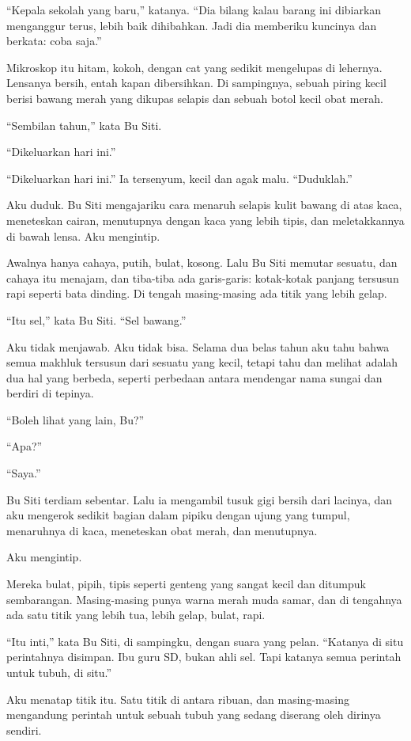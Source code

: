 \documentclass[11pt,twoside,openany]{book}
\begin{document}
``Kepala sekolah yang baru,'' katanya. ``Dia bilang kalau barang ini dibiarkan menganggur terus, lebih baik dihibahkan. Jadi dia memberiku kuncinya dan berkata: coba saja.''

Mikroskop itu hitam, kokoh, dengan cat yang sedikit mengelupas di lehernya. Lensanya bersih, entah kapan dibersihkan. Di sampingnya, sebuah piring kecil berisi bawang merah yang dikupas selapis dan sebuah botol kecil obat merah.

``Sembilan tahun,'' kata Bu Siti.

``Dikeluarkan hari ini.''

``Dikeluarkan hari ini.'' Ia tersenyum, kecil dan agak malu. ``Duduklah.''

Aku duduk. Bu Siti mengajariku cara menaruh selapis kulit bawang di atas kaca, meneteskan cairan, menutupnya dengan kaca yang lebih tipis, dan meletakkannya di bawah lensa. Aku mengintip.

Awalnya hanya cahaya, putih, bulat, kosong. Lalu Bu Siti memutar sesuatu, dan cahaya itu menajam, dan tiba-tiba ada garis-garis: kotak-kotak panjang tersusun rapi seperti bata dinding. Di tengah masing-masing ada titik yang lebih gelap.

``Itu sel,'' kata Bu Siti. ``Sel bawang.''

Aku tidak menjawab. Aku tidak bisa. Selama dua belas tahun aku tahu bahwa semua makhluk tersusun dari sesuatu yang kecil, tetapi tahu dan melihat adalah dua hal yang berbeda, seperti perbedaan antara mendengar nama sungai dan berdiri di tepinya.

``Boleh lihat yang lain, Bu?''

``Apa?''

``Saya.''

Bu Siti terdiam sebentar. Lalu ia mengambil tusuk gigi bersih dari lacinya, dan aku mengerok sedikit bagian dalam pipiku dengan ujung yang tumpul, menaruhnya di kaca, meneteskan obat merah, dan menutupnya.

Aku mengintip.

Mereka bulat, pipih, tipis seperti genteng yang sangat kecil dan ditumpuk sembarangan. Masing-masing punya warna merah muda samar, dan di tengahnya ada satu titik yang lebih tua, lebih gelap, bulat, rapi.

``Itu inti,'' kata Bu Siti, di sampingku, dengan suara yang pelan. ``Katanya di situ perintahnya disimpan. Ibu guru SD, bukan ahli sel. Tapi katanya semua perintah untuk tubuh, di situ.''

Aku menatap titik itu. Satu titik di antara ribuan, dan masing-masing mengandung perintah untuk sebuah tubuh yang sedang diserang oleh dirinya sendiri.
\end{document}
